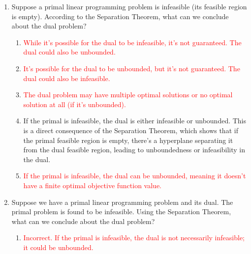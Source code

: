 \documentclass{article}%
\newcommand{\incorrect}[1]{\textcolor{red}{#1}}
\begin{document}
\begin{enumerate}
\begin{enumerate}
\item \incorrect{The Separation Theorem is a theoretical result; it doesn't directly impact the convergence speed of the simplex method.  Convergence is affected by factors like degeneracy and pivot rules.}%
\item \incorrect{Finding an initial feasible solution is addressed by techniques like the two-phase simplex method or the big-M method, not directly by the Separation Theorem.}%
\item \incorrect{The Separation Theorem doesn't guarantee the feasibility of the dual; it only states that if the primal is infeasible, then the dual is either unbounded or infeasible.  The dual's feasibility depends on the primal's structure.}%
\end{enumerate}%
\vspace{1em}%
\item Suppose a primal linear programming problem is infeasible (its feasible region is empty).  According to the Separation Theorem, what can we conclude about the dual problem?%
\begin{enumerate}%
\item \incorrect{While it's possible for the dual to be infeasible, it's not guaranteed. The dual could also be unbounded.}%
\item \incorrect{It's possible for the dual to be unbounded, but it's not guaranteed. The dual could also be infeasible.}%
\item \incorrect{The dual problem may have multiple optimal solutions or no optimal solution at all (if it's unbounded).}%
\item If the primal is infeasible, the dual is either infeasible or unbounded. This is a direct consequence of the Separation Theorem, which shows that if the primal feasible region is empty, there's a hyperplane separating it from the dual feasible region, leading to unboundedness or infeasibility in the dual.%
\item \incorrect{If the primal is infeasible, the dual can be unbounded, meaning it doesn't have a finite optimal objective function value.}%
\end{enumerate}%
\vspace{1em}%
\item Suppose we have a primal linear programming problem and its dual.  The primal problem is found to be infeasible. Using the Separation Theorem, what can we conclude about the dual problem?%
\begin{enumerate}%
\item \incorrect{Incorrect. If the primal is infeasible, the dual is not necessarily infeasible; it could be unbounded.}%

\end{enumerate}
\end{enumerate}
\end{document}
